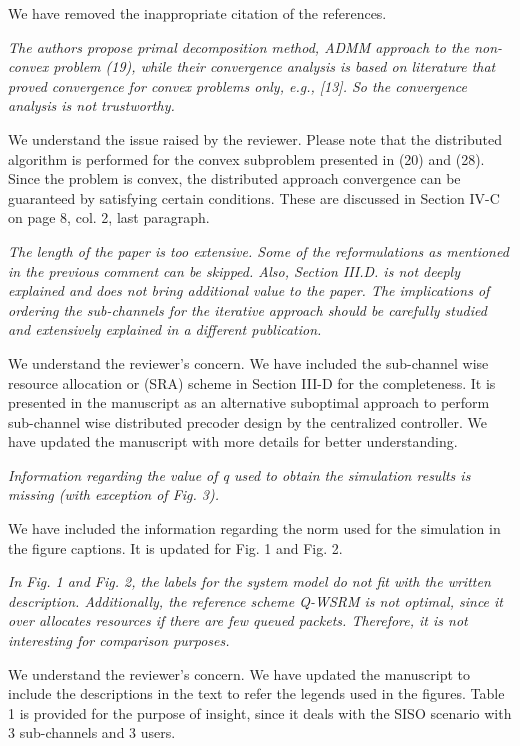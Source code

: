 \begin{itemize}
\resp We have removed the inappropriate citation of the references.

 \textit{The authors propose primal decomposition method, ADMM approach to the non-convex problem (19), while their convergence analysis is based on literature that proved convergence for convex problems only, e.g., [13]. So the convergence analysis is not trustworthy.}

\resp We understand the issue raised by the reviewer. Please note that the distributed algorithm is performed for the convex subproblem presented in (20) and (28). Since the problem is convex, the distributed approach convergence can be guaranteed by satisfying certain conditions. These are discussed in Section IV-C on page 8, col. 2, last paragraph.

 \textit{The length of the paper is too extensive. Some of the reformulations as mentioned in the previous comment can be skipped. Also, Section III.D. is not deeply explained and does not bring additional value to the paper. The implications of ordering the sub-channels for the iterative approach should be carefully studied and extensively explained in a different publication.}

\resp We understand the reviewer's concern. We have included the sub-channel wise resource allocation or (SRA) scheme in Section III-D for the completeness. It is presented in the manuscript as an alternative suboptimal approach to perform sub-channel wise distributed precoder design by the centralized controller. We have updated the manuscript with more details for better understanding.

 \textit{Information regarding the value of q used to obtain the simulation results is missing (with exception of Fig. 3).}

\resp We have included the information regarding the norm used for the simulation in the figure captions. It is updated for Fig. 1 and Fig. 2.

 \textit{In Fig. 1 and Fig. 2, the labels for the system model do not fit with the written description. Additionally, the reference scheme Q-WSRM is not optimal, since it over allocates resources if there are few queued packets. Therefore, it is not interesting for comparison purposes.}

\resp We understand the reviewer's concern. We have updated the manuscript to include the descriptions in the text to refer the legends used in the figures. Table 1 is provided for the purpose of insight, since it deals with the SISO scenario with 3 sub-channels and 3 users. 


\end{itemize}
